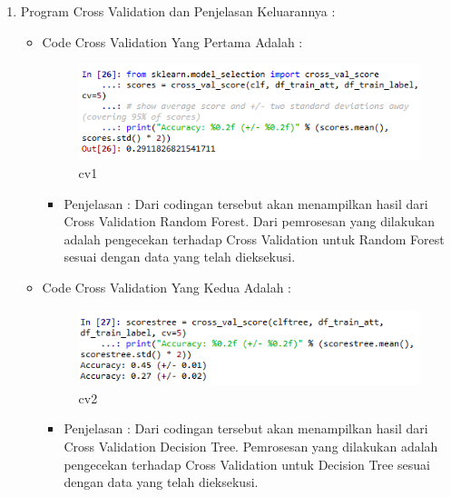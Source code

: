 \begin{enumerate}
\par
\par
\item Program Cross Validation dan Penjelasan Keluarannya :
\begin{itemize}
\item Code Cross Validation Yang Pertama Adalah :
\par
\begin{figure}[ht]
\centering
\includegraphics[scale=0.2]{figures/cv1.png}
\caption{cv1}
\label{contoh}
\end{figure}
\par
\begin{itemize}
\item Penjelasan : Dari codingan tersebut akan menampilkan hasil dari Cross Validation Random Forest. Dari pemrosesan yang dilakukan adalah pengecekan terhadap Cross Validation untuk Random Forest sesuai dengan data yang telah dieksekusi.
\par 
\par
\end{itemize}
\item Code Cross Validation Yang Kedua Adalah :
\par
\begin{figure}[ht]
\centering
\includegraphics[scale=0.2]{figures/cv2.png}
\caption{cv2}
\label{contoh}
\end{figure}
\par
\begin{itemize}
\item Penjelasan : Dari codingan tersebut akan menampilkan hasil dari Cross Validation Decision Tree. Pemrosesan yang dilakukan adalah pengecekan terhadap Cross Validation untuk Decision Tree sesuai dengan data yang telah dieksekusi.
\par
\par

\end{itemize}
\end{itemize}
\end{enumerate}
